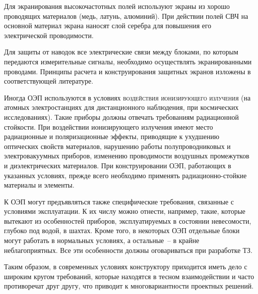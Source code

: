 Для экранирования высокочастотных полей используют экраны из хорошо проводящих материалов (медь, латунь, алюминий). При действии полей СВЧ на основной материал экрана наносят слой серебра для повышения его электрической проводимости. 

Для защиты от наводок все электрические связи между блоками, по которым передаются измерительные сигналы, необходимо осуществлять экранированными проводами. Принципы расчета и конструирования защитных экранов изложены в соответствующей литературе.

Иногда ОЭП используются в условиях \textsc{воздействия ионизирующего излучения} (на атомных электростанциях для дистанционного наблюдения, при космических исследованиях). 
Такие приборы должны отвечать требованиям радиационной стойкости. 
При воздействии ионизирующего излучения имеют место радиационные и поляризационные эффекты, приводящие к ухудшению оптических свойств материалов, нарушению работы полупроводниковых и электровакуумных приборов, изменению проводимости воздушных промежутков и диэлектрических материалов. 
При конструировании ОЭП, работающих в указанных условиях, прежде всего необходимо применять радиационно-стойкие материалы и элементы.

К ОЭП могут предъявляться также специфические требования, связанные с условиями эксплуатации. К их числу можно отнести, например, такие, которые вытекают из особенностей приборов, эксплуатируемых в состоянии невесомости, глубоко под водой, в шахтах. Кроме того, в некоторых ОЭП отдельные блоки могут работать в нормальных условиях, а остальные~-- в крайне неблагоприятных. Все эти особенности должны оговариваться при разработке ТЗ.

Таким образом, в современных условиях конструктору приходится иметь дело с широким кругом требований, которые находятся в тесном взаимодействии и часто противоречат друг другу, что приводит к многовариантности проектных решений.